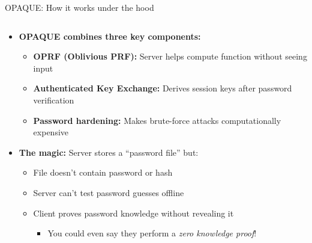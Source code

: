 \documentclass[aspectratio=169, lualatex, handout]{beamer}
\begin{document}
\begin{frame}{OPAQUE: How it works under the hood}
	\begin{columns}[c]
		\begin{column}{1\textwidth}
			\begin{itemize}
				\item \textbf{OPAQUE combines three key components:}
				      \begin{itemize}
					      \item \textbf{OPRF (Oblivious PRF):} Server helps compute function without seeing input
					      \item \textbf{Authenticated Key Exchange:} Derives session keys after password verification
					      \item \textbf{Password hardening:} Makes brute-force attacks computationally expensive
				      \end{itemize}
				\item \textbf{The magic:} Server stores a ``password file'' but:
				      \begin{itemize}
					      \item File doesn't contain password or hash
					      \item Server can't test password guesses offline
					      \item Client proves password knowledge without revealing it
					            \begin{itemize}
						            \item You could even say they perform a \textit{zero knowledge proof}!
					            \end{itemize}
				      \end{itemize}
			\end{itemize}
		\end{column}
	\end{columns}
\end{frame}
\end{document}
